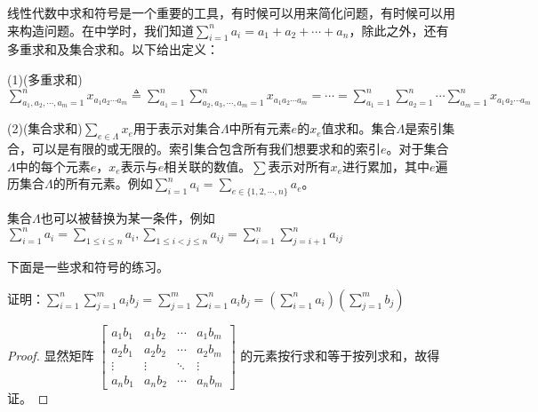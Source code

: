             线性代数中求和符号是一个重要的工具，有时候可以用来简化问题，有时候可以用来构造问题。在中学时，我们知道$\sum\limits_{i=1}^{n}a_i=a_1+a_2+\cdots+a_n$，除此之外，还有多重求和及集合求和。以下给出定义：

            \begin{definition}[多重求和及集合求和]
                (1)(多重求和)$\sum\limits_{a_1,a_2,\cdots,a_m=1}^{n}x_{a_{1}a_{2}\cdots a_{m}}\triangleq \sum\limits_{a_1=1}^n\sum\limits_{a_2,a_3,\cdots,a_m=1}^{n}x_{a_{1}a_{2}\cdots a_{m}}=\cdots=\sum\limits_{a_1=1}^n\sum\limits_{a_2=1}^n\cdots\sum\limits_{a_m=1}^{n}x_{a_{1}a_{2}\cdots a_{m}}$

                (2)(集合求和)$\sum\limits_{e\in\Lambda}x_e$用于表示对集合$\Lambda$中所有元素$e$的$x_e$值求和。集合$\Lambda$是索引集合，可以是有限的或无限的。索引集合包含所有我们想要求和的索引$e$。对于集合$\Lambda$中的每个元素$e$，$x_e$表示与$e$相关联的数值。$\sum$表示对所有$x_e$进行累加，其中$e$遍历集合$\Lambda$的所有元素。例如$\sum\limits_{i=1}^{n}a_i=\sum\limits_{e\in \{1,2,\cdots,n\}}a_e$。

                集合$\Lambda$也可以被替换为某一条件，例如$\sum\limits_{i=1}^{n}a_i=\sum\limits_{1\leq i\leq n}a_i,\sum\limits_{1\leq i<j\leq n}a_{ij}=\sum\limits_{i=1}^n\sum\limits_{j=i+1}^{n}a_{ij}$
            \end{definition}

            下面是一些求和符号的练习。

            \begin{example}
                证明：$\sum\limits_{i=1}^n\sum\limits_{j=1}^{m}a_{i}{b_j}=\sum\limits_{j=1}^{m}\sum_{i=1}^{n}a_{i}{b_j}=\left(\sum\limits_{i=1}^{n}a_{i}\right) \left(\sum\limits_{j=1}^{m}b_{j}\right)$
            \end{example}

            \begin{proof}
                显然矩阵
                $\begin{bmatrix}
                    a_{1}b_{1} & a_{1}b_{2} & \cdots & a_{1}b_{m} \\
                    a_{2}b_{1} & a_{2}b_{2} & \cdots & a_{2}b_{m} \\
                    \vdots & \vdots & \ddots & \vdots \\
                    a_{n}b_{1} & a_{n}b_{2} & \cdots & a_{n}b_{m}
                \end{bmatrix}$
               的元素按行求和等于按列求和，故得证。
            \end{proof}

